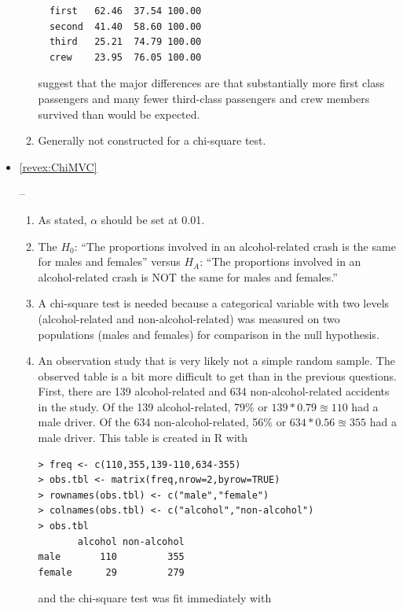 \documentclass[10pt,openany]{book}\usepackage[]{graphicx}\usepackage[]{color}
\makeatletter
\newenvironment{kframe}{%
 \def\at@end@of@kframe{}%
 \ifinner\ifhmode%
  \def\at@end@of@kframe{\end{minipage}}%
  \begin{minipage}{\columnwidth}%
 \fi\fi%
 \def\FrameCommand##1{\hskip\@totalleftmargin \hskip-\fboxsep
 \colorbox{shadecolor}{##1}\hskip-\fboxsep
     \hskip-\linewidth \hskip-\@totalleftmargin \hskip\columnwidth}%
 \MakeFramed {\advance\hsize-\width
   \@totalleftmargin\z@ \linewidth\hsize
   \@setminipage}}%
 {\par\unskip\endMakeFramed%
 \at@end@of@kframe}
\newenvironment{knitrout}{}{} %
\makeatother
\begin{document}
\begin{itemize}
\begin{enumerate}
\begin{knitrout}
\begin{kframe}
\begin{verbatim}
  first   62.46  37.54 100.00
  second  41.40  58.60 100.00
  third   25.21  74.79 100.00
  crew    23.95  76.05 100.00
\end{verbatim}
\end{kframe}
\end{knitrout}
suggest that the major differences are that substantially more first class passengers and many fewer third-class passengers and crew members survived than would be expected.
      \item Generally not constructed for a chi-square test.
    \end{enumerate}
  \item \hypertarget{ans:ChiMVC}{\ref{revex:ChiMVC}} --
    \begin{enumerate}
      \item As stated, $\alpha$ should be set at 0.01.
      \item The $H_{0}$: ``The proportions involved in an alcohol-related crash is the same for males and females'' versus $H_{A}$: ``The proportions involved in an alcohol-related crash is NOT the same for males and females.''
      \item A chi-square test is needed because a categorical variable with two levels (alcohol-related and non-alcohol-related) was measured on two populations (males and females) for comparison in the null hypothesis.
      \item An observation study that is very likely not a simple random sample.  The observed table is a bit more difficult to get than in the previous questions.  First, there are 139 alcohol-related and 634 non-alcohol-related accidents in the study.  Of the 139 alcohol-related, 79\% or $139*0.79\approxeq110$ had a male driver.  Of the 634 non-alcohol-related, 56\% or $634*0.56\approxeq355$ had a male driver.  This table is created in R with
\begin{knitrout}
\color{fgcolor}\begin{kframe}
\begin{verbatim}
> freq <- c(110,355,139-110,634-355)
> obs.tbl <- matrix(freq,nrow=2,byrow=TRUE)
> rownames(obs.tbl) <- c("male","female")
> colnames(obs.tbl) <- c("alcohol","non-alcohol")
> obs.tbl
       alcohol non-alcohol
male       110         355
female      29         279
\end{verbatim}
\end{kframe}
\end{knitrout}
and the chi-square test was fit immediately with
\begin{knitrout}

\end{knitrout}
\end{enumerate}
\end{itemize}
\end{document}
